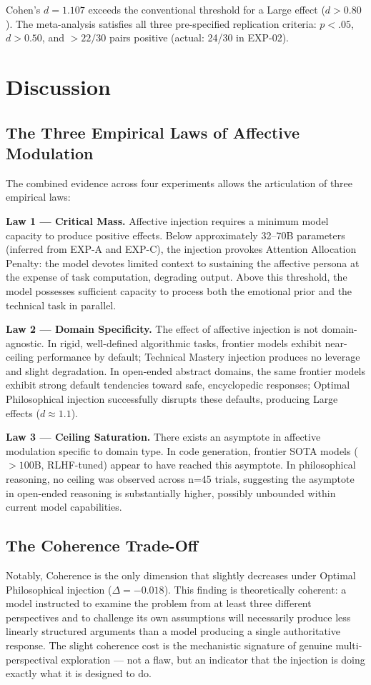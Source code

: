 \documentclass[12pt, a4paper]{article}
\begin{document}
Cohen's $d = 1.107$ exceeds the conventional threshold for a Large effect ($d > 0.80$). The meta-analysis satisfies all three pre-specified replication criteria: $p < .05$, $d > 0.50$, and $> 22/30$ pairs positive (actual: 24/30 in EXP-02).

\section{Discussion}

\subsection{The Three Empirical Laws of Affective Modulation}

The combined evidence across four experiments allows the articulation of three empirical laws:

\textbf{Law 1 — Critical Mass.} Affective injection requires a minimum model capacity to produce positive effects. Below approximately 32–70B parameters (inferred from EXP-A and EXP-C), the injection provokes Attention Allocation Penalty: the model devotes limited context to sustaining the affective persona at the expense of task computation, degrading output. Above this threshold, the model possesses sufficient capacity to process both the emotional prior and the technical task in parallel.

\textbf{Law 2 — Domain Specificity.} The effect of affective injection is not domain-agnostic. In rigid, well-defined algorithmic tasks, frontier models exhibit near-ceiling performance by default; Technical Mastery injection produces no leverage and slight degradation. In open-ended abstract domains, the same frontier models exhibit strong default tendencies toward safe, encyclopedic responses; Optimal Philosophical injection successfully disrupts these defaults, producing Large effects ($d \approx 1.1$).

\textbf{Law 3 — Ceiling Saturation.} There exists an asymptote in affective modulation specific to domain type. In code generation, frontier SOTA models ($>100$B, RLHF-tuned) appear to have reached this asymptote. In philosophical reasoning, no ceiling was observed across n=45 trials, suggesting the asymptote in open-ended reasoning is substantially higher, possibly unbounded within current model capabilities.

\subsection{The Coherence Trade-Off}
Notably, Coherence is the only dimension that slightly decreases under Optimal Philosophical injection ($\Delta = -0.018$). This finding is theoretically coherent: a model instructed to examine the problem from at least three different perspectives and to challenge its own assumptions will necessarily produce less linearly structured arguments than a model producing a single authoritative response. The slight coherence cost is the mechanistic signature of genuine multi-perspectival exploration — not a flaw, but an indicator that the injection is doing exactly what it is designed to do.
\end{document}
